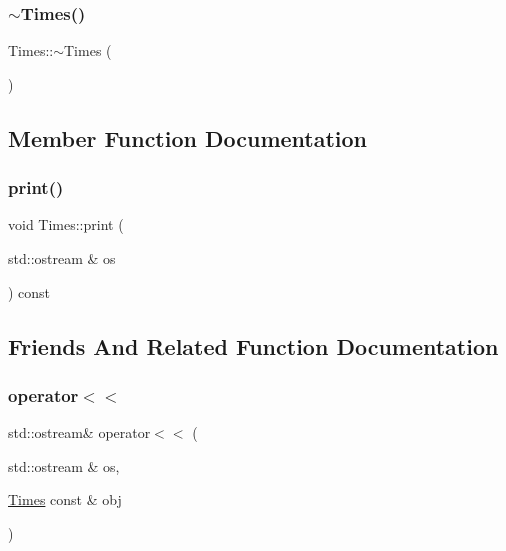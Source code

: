 \subsubsection{\texorpdfstring{$\sim$\+Times()}{~Times()}}
{\footnotesize\ttfamily Times\+::$\sim$\+Times (\begin{DoxyParamCaption}{ }\end{DoxyParamCaption})\hspace{0.3cm}{\ttfamily [virtual]}}



\subsection{Member Function Documentation}
\mbox{\label{class_times_acdfa95279c544d2cee2f33415fe4909c}} 
\subsubsection{\texorpdfstring{print()}{print()}}
{\footnotesize\ttfamily void Times\+::print (\begin{DoxyParamCaption}\item[{std\+::ostream \&}]{os }\end{DoxyParamCaption}) const}



\subsection{Friends And Related Function Documentation}
\mbox{\label{class_times_a0c37c7d9833e9b02d1a219555f55fe34}} 
\subsubsection{\texorpdfstring{operator$<$$<$}{operator<<}}
{\footnotesize\ttfamily std\+::ostream\& operator$<$$<$ (\begin{DoxyParamCaption}\item[{std\+::ostream \&}]{os,  }\item[{\mbox{\hyperlink{class_times}{Times}} const \&}]{obj }\end{DoxyParamCaption})\hspace{0.3cm}{\ttfamily [friend]}}



